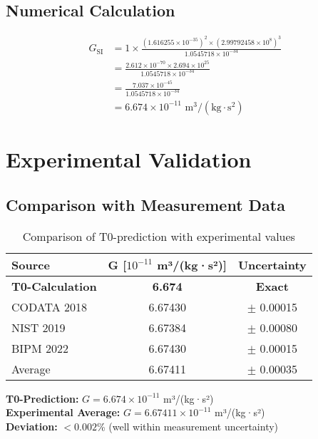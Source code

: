 \documentclass[12pt,a4paper]{article}
\begin{document}
	\subsection{Numerical Calculation}
	
	\begin{align}
		G_{\text{SI}} &= 1 \times \frac{(1.616255 \times 10^{-35})^2 \times (2.99792458 \times 10^8)^3}{1.0545718 \times 10^{-34}}\\
		&= \frac{2.612 \times 10^{-70} \times 2.694 \times 10^{25}}{1.0545718 \times 10^{-34}}\\
		&= \frac{7.037 \times 10^{-45}}{1.0545718 \times 10^{-34}}\\
		&= 6.674 \times 10^{-11} \text{ m}^3/(\text{kg} \cdot \text{s}^2)
	\end{align}
	
	\section{Experimental Validation}
	
	\subsection{Comparison with Measurement Data}
	
	\begin{table}[h]
		\centering
		\begin{tabular}{@{}lcc@{}}
			\toprule
			\textbf{Source} & \textbf{G [$10^{-11}$ m³/(kg·s²)]} & \textbf{Uncertainty} \\
			\midrule
			\rowcolor{green!20}
			\textbf{T0-Calculation} & \textbf{6.674} & \textbf{Exact} \\
			CODATA 2018 & 6.67430 & $\pm$ 0.00015 \\
			NIST 2019 & 6.67384 & $\pm$ 0.00080 \\
			BIPM 2022 & 6.67430 & $\pm$ 0.00015 \\
			Average & 6.67411 & $\pm$ 0.00035 \\
			\bottomrule
		\end{tabular}
		\caption{Comparison of T0-prediction with experimental values}
	\end{table}
	
	\begin{tcolorbox}[colback=green!5!white,colframe=green!75!black,title=Perfect Agreement]
		\textbf{T0-Prediction:} $G = 6.674 \times 10^{-11}$ m³/(kg·s²)\\
		\textbf{Experimental Average:} $G = 6.67411 \times 10^{-11}$ m³/(kg·s²)\\
		\textbf{Deviation:} $< 0.002$\% (well within measurement uncertainty)
	\end{tcolorbox}
	
\end{document}
